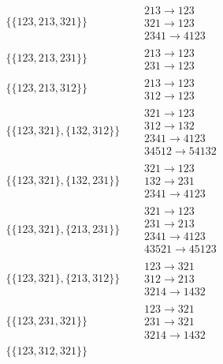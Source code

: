 \begin{tiny}
\begin{align}
\begin{matrix}
\end{matrix}
\\
\{\{123, 213, 321\}\}
\quad
&
\begin{matrix}
213 \to 123\\321 \to 123\\2341 \to 4123
\end{matrix}
\\
\{\{123, 213, 231\}\}
\quad
&
\begin{matrix}
213 \to 123\\231 \to 123
\end{matrix}
\\
\{\{123, 213, 312\}\}
\quad
&
\begin{matrix}
213 \to 123\\312 \to 123
\end{matrix}
\\
\{\{123, 321\}, \{132, 312\}\}
\quad
&
\begin{matrix}
321 \to 123\\312 \to 132\\2341 \to 4123\\34512 \to 54132
\end{matrix}
\\
\{\{123, 321\}, \{132, 231\}\}
\quad
&
\begin{matrix}
321 \to 123\\132 \to 231\\2341 \to 4123
\end{matrix}
\\
\{\{123, 321\}, \{213, 231\}\}
\quad
&
\begin{matrix}
321 \to 123\\231 \to 213\\2341 \to 4123\\43521 \to 45123
\end{matrix}
\\
\{\{123, 321\}, \{213, 312\}\}
\quad
&
\begin{matrix}
123 \to 321\\312 \to 213\\3214 \to 1432
\end{matrix}
\\
\{\{123, 231, 321\}\}
\quad
&
\begin{matrix}
123 \to 321\\231 \to 321\\3214 \to 1432
\end{matrix}
\\
\{\{123, 312, 321\}\}
\quad
&
\begin{matrix}

\end{matrix}
\end{align}
\end{tiny}

